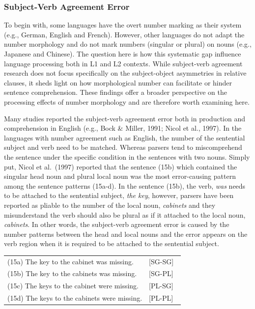 \documentclass[
]{article}
\begin{document}
\subsubsection{Subject-Verb Agreement
Error}\label{subject-verb-agreement-error}

To begin with, some languages have the overt number marking as their
system (e.g., German, English and French). However, other languages do
not adapt the number morphology and do not mark numbers (singular or
plural) on nouns (e.g., Japanese and Chinese). The question here is how
this systematic gap influence language processing both in L1 and L2
contexts. While subject-verb agreement research does not focus
specifically on the subject-object asymmetries in relative clauses, it
sheds light on how morphological number can facilitate or hinder
sentence comprehension. These findings offer a broader perspective on
the processing effects of number morphology and are therefore worth
examining here.

Many studies reported the subject-verb agreement error both in
production and comprehension in English (e.g., Bock \& Miller, 1991;
Nicol et al., 1997). In the languages with number agreement such as
English, the number of the sentential subject and verb need to be
matched. Whereas parsers tend to miscomprehend the sentence under the
specific condition in the sentences with two nouns. Simply put, Nicol et
al.~(1997) reported that the sentence (15b) which contained the singular
head noun and plural local noun was the most error-causing pattern among
the sentence patterns (15a-d). In the sentence (15b), the verb,
\emph{was} needs to be attached to the sentential subject, \emph{the
key}, however, parsers have been reported as pliable to the number of
the local noun, \emph{cabinets} and they misunderstand the verb should
also be plural as if it attached to the local noun, \emph{cabinets}. In
other words, the subject-verb agreement error is caused by the number
patterns between the head and local nouns and the error appears on the
verb region when it is required to be attached to the sentential
subject.

\vspace{1em}

\noindent
\begin{tabular}{@{}p{0.8\linewidth} p{2.5cm}@{}}
(15a) The key to the cabinet was missing. & \hfill [SG-SG] \\
(15b) The key to the cabinets was missing. & \hfill [SG-PL] \\
(15c) The keys to the cabinet were missing. & \hfill [PL-SG] \\
(15d) The keys to the cabinets were missing. & \hfill [PL-PL] \\
\end{tabular}
\end{document}
